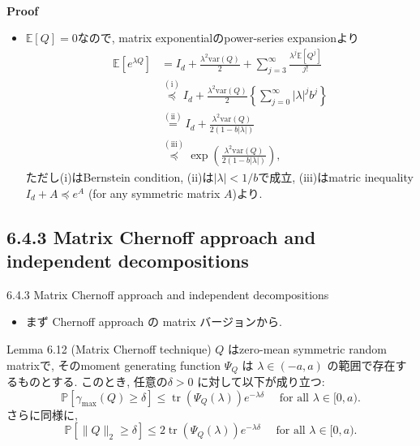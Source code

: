 \documentclass[unicode,aspectratio=169,11pt]{beamer}
\newcommand{\ex}{\mathbb{E}}
\newcommand{\var}{\mathrm{var}}
\begin{document}
\begin{frame}{}{}
  　\\
  {\bf Proof}
  \begin{itemize}
    \item $\ex[Q] = 0$なので, matrix exponentialのpower-series expansionより
          \begin{align*}
            \ex[e^{\lambda Q}] 
            &= I_d + \frac{\lambda^2 \var(Q)}{2} + \sum_{j=3}^\infty \frac{\lambda^j \ex[Q^j]}{j!}\\
            &\stackrel{(\mathrm{i})}{\preceq} I_d + \frac{\lambda^2 \var(Q)}{2}\left\{\sum_{j=0}^\infty |\lambda|^jb^j\right\}\\
            &\stackrel{(\mathrm{ii})}{=} I_d + \frac{\lambda^2 \var(Q)}{2(1 - b|\lambda|)} \\
            &\stackrel{(\mathrm{iii})}{\preceq} \exp\left( \frac{\lambda^2 \var(Q)}{2(1 - b|\lambda|)} \right),
          \end{align*}
          ただし(i)はBernstein condition, (ii)は$|\lambda| < 1/b$で成立, (iii)はmatric inequality $I_d + A \preceq e^A$ (for any symmetric matrix $A$)より.
  \end{itemize} 
\end{frame}

\subsection{6.4.3 Matrix Chernoff approach and independent decompositions}

\begin{frame}{6.4.3 Matrix Chernoff approach and independent decompositions}
  \begin{itemize}
    \item まず Chernoff approach の matrix バージョンから.
  \end{itemize}
  \begin{block}{Lemma 6.12 (Matrix Chernoff technique)}
    $Q$ はzero-mean symmetric random matrixで,
    そのmoment generating function $\Psi_Q$ は $\lambda \in (-a, a)$ の範囲で存在するものとする.
    このとき, 任意の$\delta > 0$ に対して以下が成り立つ:
    \[
      \mathbb{P}\left[\gamma_{\max }( {Q}) \geq \delta\right]
      \leq \operatorname{tr}\left(\Psi_{ {Q}}(\lambda)\right) e^{-\lambda \delta} \quad \text { for all } \lambda \in[0, a).
    \tag{6.32}
    \]
    さらに同様に,
    \[
      \mathbb{P}\left[\| {Q}\|_{2} \geq \delta\right]
      \leq 2 \operatorname{tr}\left(\Psi_{ {Q}}(\lambda)\right) e^{-\lambda \delta} \quad \text { for all } \lambda \in[0, a).
      \tag{6.33}
    \]
  \end{block}
\end{frame}
\end{document}
